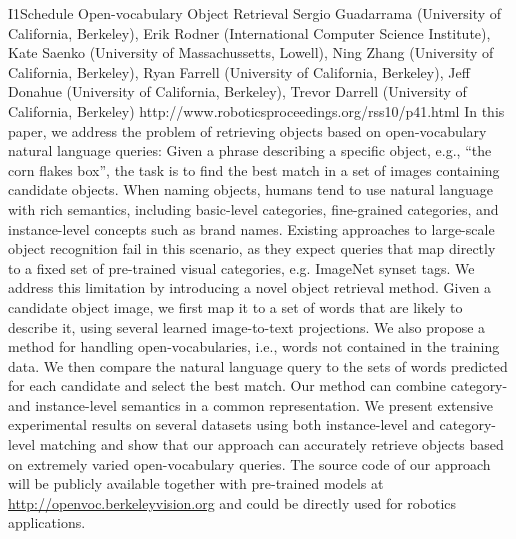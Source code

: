 \begin{spacing}{1.0}
\descriptionPaper
{I1}{Schedule}
{	
Open-vocabulary Object Retrieval 
}
{
Sergio Guadarrama (University of California, Berkeley), Erik Rodner (International Computer Science Institute), Kate Saenko (University of Massachussetts, Lowell), Ning Zhang (University of California, Berkeley), Ryan Farrell (University of California, Berkeley), Jeff Donahue (University of California, Berkeley), Trevor Darrell (University of California, Berkeley)
}
{
http://www.roboticsproceedings.org/rss10/p41.html
}
{
In this paper, we address the problem of retrieving objects based on open-vocabulary natural language queries: Given a phrase describing a specific object, e.g., ``the corn flakes box'', the task is to find the best match in a set of images containing candidate objects. When naming objects, humans tend to use natural language with rich semantics, including basic-level categories, fine-grained categories, and instance-level concepts such as brand names. Existing approaches to large-scale object recognition fail in this scenario, as they expect queries that map directly to a fixed set of pre-trained visual categories, e.g. ImageNet synset tags. We address this limitation by introducing a novel object retrieval method. Given a candidate object image, we first map it to a set of words that are likely to describe it, using several learned image-to-text projections. We also propose a method for handling open-vocabularies, i.e., words not contained in the training data. We then compare the natural language query to the sets of words predicted for each candidate and select the best match. Our method can combine category- and instance-level semantics in a common representation. We present extensive experimental results on several datasets using both instance-level and category-level matching and show that our approach can accurately retrieve objects based on extremely varied open-vocabulary queries. The source code of our approach will be publicly available together with pre-trained models at \url{http://openvoc.berkeleyvision.org} and could be directly used for robotics applications.
}




\end{spacing}
